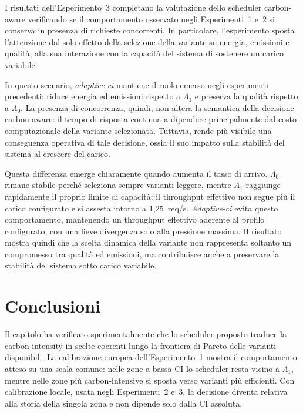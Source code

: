 I risultati dell'Esperimento~3 completano la valutazione dello scheduler
carbon-aware verificando se il comportamento osservato negli
Esperimenti~1 e~2 si conserva in presenza di richieste concorrenti. In
particolare, l'esperimento sposta l'attenzione dal solo effetto della
selezione della variante su energia, emissioni e qualità, alla sua
interazione con la capacità del sistema di sostenere un carico variabile.

In questo scenario, \emph{adaptive-ci} mantiene il ruolo emerso negli
esperimenti precedenti: riduce energia ed emissioni rispetto a
$\Lambda_1$ e preserva la qualità rispetto a $\Lambda_0$. La presenza di
concorrenza, quindi, non altera la semantica della decisione
carbon-aware: il tempo di risposta continua a dipendere principalmente
dal costo computazionale della variante selezionata. Tuttavia, rende più
visibile una conseguenza operativa di tale decisione, ossia il suo impatto
sulla stabilità del sistema al crescere del carico.

Questa differenza emerge chiaramente quando aumenta il tasso di arrivo.
$\Lambda_0$ rimane stabile perché seleziona sempre varianti leggere,
mentre $\Lambda_1$ raggiunge rapidamente il proprio limite di capacità:
il throughput effettivo non segue più il carico configurato e si assesta
intorno a 1{,}25~req/s. \emph{Adaptive-ci} evita questo comportamento,
mantenendo un throughput effettivo aderente al profilo configurato, con
una lieve divergenza solo alla pressione massima. Il risultato mostra
quindi che la scelta dinamica della variante non rappresenta soltanto un
compromesso tra qualità ed emissioni, ma contribuisce anche a preservare
la stabilità del sistema sotto carico variabile.


\section{Conclusioni}
\label{sec:conclusioni-capitolo5}

Il capitolo ha verificato sperimentalmente che lo scheduler proposto
traduce la carbon intensity in scelte coerenti lungo la frontiera di
Pareto delle varianti disponibili. La calibrazione europea
dell'Esperimento~1 mostra il comportamento atteso su una scala comune:
nelle zone a bassa CI lo scheduler resta vicino a $\Lambda_1$, mentre
nelle zone più carbon-intensive si sposta verso varianti più efficienti.
Con calibrazione locale, usata negli Esperimenti~2 e~3, la decisione
diventa relativa alla storia della singola zona e non dipende solo dalla
CI assoluta.

